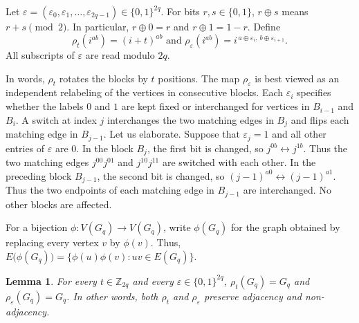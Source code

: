 \documentclass[11pt]{article}
\newtheorem{lemma}[theorem]{Lemma}
\theoremstyle{definition}
\theoremstyle{remark}
\begin{document}
Let $\varepsilon=(\varepsilon_0,\varepsilon_1,\ldots,\varepsilon_{2q-1})\in\{0,1\}^{2q}$.
For bits $r,s\in\{0,1\}$,  $r\oplus s$ means $r+s\pmod 2$.
In particular, $r\oplus0=r$ and 
  $r\oplus1=1-r$.
Define
\[
  \rho_t(i^{ab})=(i+t)^{ab}
  \text{ and }
  \rho_\varepsilon(i^{ab})
    =i^{\,a\oplus\varepsilon_i,\,
    b\oplus\varepsilon_{i+1}}.
\]
All subscripts of $\varepsilon$ are read modulo $2q$.

In words, $\rho_t$ rotates the blocks by $t$ positions.
The map $\rho_\varepsilon$ is best viewed as an independent relabeling of the vertices in consecutive blocks.
Each $\varepsilon_i$ specifies whether the labels $0$ and $1$ are kept fixed or interchanged for vertices in $B_{i-1}$ and $B_i$.
A switch at index $j$ interchanges the two matching edges in $B_j$ and flips each matching edge in $B_{j-1}$.
Let us elaborate. 
Suppose that $\varepsilon_j=1$ and all other entries of $\varepsilon$ are $0$.  
In the block $B_j$, the first bit is changed, so $j^{0b}\leftrightarrow j^{1b}$.
Thus the two matching edges $j^{00}j^{01}$ and $j^{10}j^{11}$ are switched with each other.  
In the preceding block $B_{j-1}$, the second bit is changed, so $(j-1)^{a0}\leftrightarrow (j-1)^{a1}$.
Thus the two endpoints of each matching edge in $B_{j-1}$ are interchanged.
No other blocks are affected.  


For a bijection $\phi:V(G_q)\to V(G_q)$, write $\phi(G_q)$ for the graph obtained by replacing every vertex $v$ by $\phi(v)$.
Thus, $E\bigl(\phi(G_q)\bigr)
  =\{\phi(u)\phi(v):uv\in E(G_q)\}$.

\begin{lemma}
\label{lem:relabelings}
For every $t\in\mathbb Z_{2q}$ and every $\varepsilon\in\{0,1\}^{2q}$,
$\rho_t(G_q)= G_q$ and $\rho_\varepsilon(G_q)= G_q$.
In other words, both $\rho_t$ and $\rho_\varepsilon$ preserve adjacency and non-adjacency.
\end{lemma}
\end{document}
